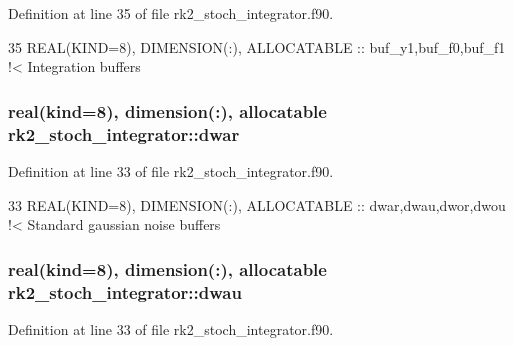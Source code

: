 Definition at line 35 of file rk2\+\_\+stoch\+\_\+integrator.\+f90.


\begin{DoxyCode}
35   \textcolor{keywordtype}{REAL(KIND=8)}, \textcolor{keywordtype}{DIMENSION(:)}, \textcolor{keywordtype}{ALLOCATABLE} :: buf\_y1,buf\_f0,buf\_f1\textcolor{comment}{ !< Integration buffers}
\end{DoxyCode}
\subsubsection[{\texorpdfstring{dwar}{dwar}}]{\setlength{\rightskip}{0pt plus 5cm}real(kind=8), dimension(\+:), allocatable rk2\+\_\+stoch\+\_\+integrator\+::dwar\hspace{0.3cm}{\ttfamily [private]}}\hypertarget{namespacerk2__stoch__integrator_abfc963ed17f278357be8da9473244c38}{}\label{namespacerk2__stoch__integrator_abfc963ed17f278357be8da9473244c38}


Definition at line 33 of file rk2\+\_\+stoch\+\_\+integrator.\+f90.


\begin{DoxyCode}
33   \textcolor{keywordtype}{REAL(KIND=8)}, \textcolor{keywordtype}{DIMENSION(:)}, \textcolor{keywordtype}{ALLOCATABLE} :: dwar,dwau,dwor,dwou\textcolor{comment}{ !< Standard gaussian noise buffers}
\end{DoxyCode}
\subsubsection[{\texorpdfstring{dwau}{dwau}}]{\setlength{\rightskip}{0pt plus 5cm}real(kind=8), dimension(\+:), allocatable rk2\+\_\+stoch\+\_\+integrator\+::dwau\hspace{0.3cm}{\ttfamily [private]}}\hypertarget{namespacerk2__stoch__integrator_a01c22fa8c4f3e14201f3e0f32aa8cc3d}{}\label{namespacerk2__stoch__integrator_a01c22fa8c4f3e14201f3e0f32aa8cc3d}


Definition at line 33 of file rk2\+\_\+stoch\+\_\+integrator.\+f90.

